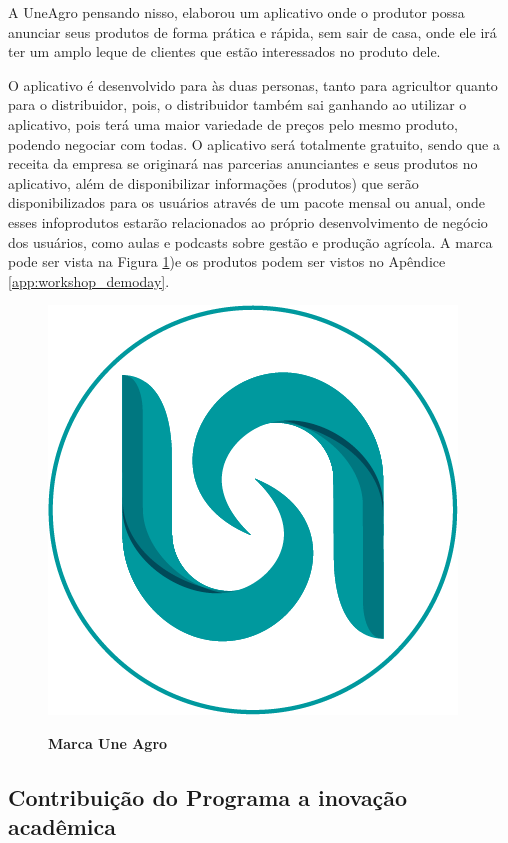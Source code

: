 A UneAgro pensando nisso, elaborou um aplicativo onde o produtor possa anunciar seus produtos de forma prática e rápida, sem sair de casa, onde ele irá ter um amplo leque de clientes que estão interessados no produto dele.

O aplicativo é desenvolvido para às duas personas, tanto para agricultor quanto para o distribuidor, pois, o distribuidor também sai ganhando ao utilizar o aplicativo, pois terá uma maior variedade de preços pelo mesmo produto, podendo negociar com todas. O aplicativo será totalmente gratuito, sendo que a receita da empresa se originará nas parcerias anunciantes e seus produtos no aplicativo, além de disponibilizar informações (produtos) que serão disponibilizados para os usuários através de um pacote mensal ou anual, onde esses infoprodutos estarão relacionados ao próprio desenvolvimento de negócio dos usuários, como aulas e podcasts sobre gestão e produção agrícola. A marca pode ser vista na Figura \ref{figura_28})e os produtos podem ser vistos no Apêndice \ref{app:workshop_demoday}.

\begin{figure}[H]
\centering
\caption{\textbf{Marca Une Agro}}
\includegraphics[scale=1.5]{Imagens/uneagro.png}
\label{figura_28}
\end{figure}




\subsection{Contribuição do Programa a inovação acadêmica}



